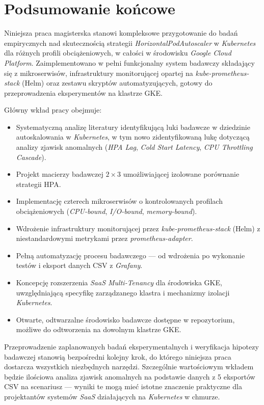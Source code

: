 \section{Podsumowanie końcowe}

Niniejsza praca magisterska stanowi kompleksowe przygotowanie do badań empirycznych nad skutecznością strategii \textit{HorizontalPodAutoscaler} w \textit{Kubernetes} dla różnych profili obciążeniowych, w całości w środowisku \textit{Google Cloud Platform}. Zaimplementowano w pełni funkcjonalny system badawczy składający się z mikroserwisów, infrastruktury monitorującej opartej na \textit{kube-prometheus-stack} (Helm) oraz zestawu skryptów automatyzujących, gotowy do przeprowadzenia eksperymentów na klastrze GKE.

Główny wkład pracy obejmuje:

\begin{itemize}
  \item Systematyczną analizę literatury identyfikującą luki badawcze w dziedzinie autoskalowania w \textit{Kubernetes}, w tym nowo zidentyfikowaną lukę dotyczącą analizy zjawisk anomalnych (\textit{HPA Lag}, \textit{Cold Start Latency}, \textit{CPU Throttling Cascade}).
  \item Projekt macierzy badawczej $2 \times 3$ umożliwiającej izolowane porównanie strategii HPA.
  \item Implementację czterech mikroserwisów o kontrolowanych profilach obciążeniowych (\textit{CPU-bound}, \textit{I/O-bound}, \textit{memory-bound}).
  \item Wdrożenie infrastruktury monitorującej przez \textit{kube-prometheus-stack} (Helm) z niestandardowymi metrykami przez \textit{prometheus-adapter}.
  \item Pełną automatyzację procesu badawczego — od wdrożenia po wykonanie testów i eksport danych CSV z \textit{Grafany}.
  \item Koncepcję rozszerzenia \textit{SaaS Multi-Tenancy} dla środowiska GKE, uwzględniającą specyfikę zarządzanego klastra i mechanizmy izolacji \textit{Kubernetes}.
  \item Otwarte, odtwarzalne środowisko badawcze dostępne w repozytorium, możliwe do odtworzenia na dowolnym klastrze GKE.
\end{itemize}

Przeprowadzenie zaplanowanych badań eksperymentalnych i weryfikacja hipotezy badawczej stanowią bezpośredni kolejny krok, do którego niniejsza praca dostarcza wszystkich niezbędnych narzędzi. Szczególnie wartościowym wkładem będzie ilościowa analiza zjawisk anomalnych na podstawie danych z 5 eksportów CSV na scenariusz — wyniki te mogą mieć istotne znaczenie praktyczne dla projektantów systemów \textit{SaaS} działających na \textit{Kubernetes} w chmurze.
